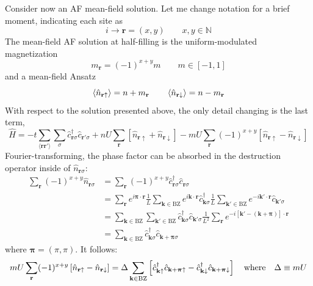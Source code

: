 Consider now an AF mean-field solution. Let me change notation for a brief moment, indicating each site as
\[
	i \to \mathbf{r} = (x,y)
	\qquad
	x,y \in \mathbb{N}
\]
The mean-field AF solution at half-filling is the uniform-modulated magnetization
\[
	m_\mathbf{r} = (-1)^{x+y} m
	\qquad
	m \in [-1,1]
\]
and a mean-field Ansatz
\[
	\ev{\hat n_{\mathbf{r}\uparrow}} = n+m_\mathbf{r}
	\qquad
	\ev{\hat n_{\mathbf{r}\downarrow}} = n-m_\mathbf{r}
\]
With respect to the solution presented above, the only detail changing is the last term,
\begin{equation}\label{appeq:hubbard-mean-field-hamiltonian}
	\hat H = -t \sum_{\langle \mathbf{r}\mathbf{r}' \rangle} \sum_\sigma \hat c_{\mathbf{r}\sigma}^\dagger \hat c_{\mathbf{r}'\sigma}
	+ nU \sum_\mathbf{r} \left[
		\hat n_{\mathbf{r}\uparrow} + \hat n_{\mathbf{r}\downarrow}
	\right] - mU \sum_\mathbf{r} (-1)^{x+y} \left[
		\hat n_{\mathbf{r}\uparrow} - \hat n_{\mathbf{r}\downarrow}
	\right]
\end{equation}
Fourier-transforming, the phase factor can be absorbed in the destruction operator inside of $\hat n_{\mathbf{r}\sigma}$:
\[
\begin{aligned}
	\sum_\mathbf{r} (-1)^{x+y} \hat n_{\mathbf{r}\sigma} &= \sum_\mathbf{r} (-1)^{x+y} \hat c_{\mathbf{r}\sigma}^\dagger \hat c_{\mathbf{r}\sigma} \\
	&= 
	\sum_\mathbf{r} e^{i \bm{\pi} \cdot \mathbf{r}}
	\frac{1}{L} \sum_{\mathbf{k} \in \mathrm{BZ}} e^{i \mathbf{k} \cdot \mathbf{r}} \hat c_{\mathbf{k}\sigma}^\dagger \frac{1}{L} \sum_{\mathbf{k}' \in \mathrm{BZ}} e^{-i \mathbf{k}' \cdot \mathbf{r}} \hat c_{\mathbf{k}'\sigma} \\
	&= \sum_{\mathbf{k} \in \mathrm{BZ}} \sum_{\mathbf{k}' \in \mathrm{BZ}} \hat c_{\mathbf{k}\sigma}^\dagger \hat c_{\mathbf{k}'\sigma} \frac{1}{L^2} \sum_\mathbf{r} e^{-i [\mathbf{k}' - (\mathbf{k} + \bm{\pi}) ] \cdot \mathbf{r}} \\
	&= \sum_{\mathbf{k} \in \mathrm{BZ}} \hat c_{\mathbf{k}\sigma}^\dagger \hat c_{\mathbf{k}+\bm{\pi}\sigma}
\end{aligned}
\]
where $\bm{\pi} = (\pi,\pi)$. It follows:
\[
mU \sum_\mathbf{r} (-1)^{x+y} \left[
		\hat n_{\mathbf{r}\uparrow} - \hat n_{\mathbf{r}\downarrow}
	\right] = \Delta \sum_{\mathbf{k} \in \mathrm{BZ}} \left[
		\hat c_{\mathbf{k}\uparrow}^\dagger \hat c_{\mathbf{k}+\bm{\pi}\uparrow} - \hat c_{\mathbf{k}\downarrow}^\dagger \hat c_{\mathbf{k}+\bm{\pi}\downarrow}
	\right]
	\qq{where}
	\Delta \equiv mU
\]

